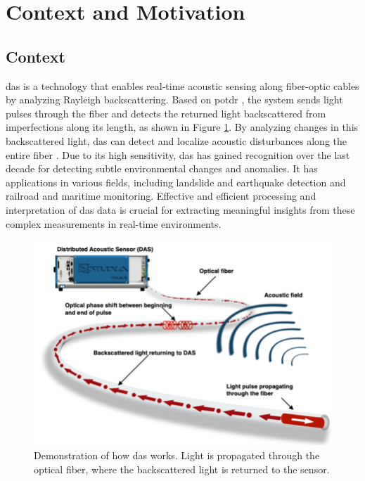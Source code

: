 \section{Context and Motivation}


\subsection{Context} 

\acrshort{das} is a technology that enables real-time acoustic sensing along fiber-optic cables by analyzing Rayleigh backscattering. Based on \acrfull{potdr} \cite{s16050681}, the system sends light pulses through the fiber and detects the returned light backscattered from imperfections along its length, as shown in Figure \ref{fig:das-fig}. By analyzing changes in this backscattered light, \acrshort{das} can detect and localize acoustic disturbances along the entire fiber \cite{shang2016optical}. Due to its high sensitivity, \acrshort{das} has gained recognition over the last decade for detecting subtle environmental changes and anomalies. It has applications in various fields, including landslide and earthquake detection and railroad and maritime monitoring. Effective and efficient processing and interpretation of \acrshort{das} data is crucial for extracting meaningful insights from these complex measurements in real-time environments.

\begin{figure}[!h]
    \centering
    \includegraphics[width=0.7\linewidth]{figures/das.png}
    \caption{Demonstration of how \acrshort{das} works. Light is propagated through the optical fiber, where the backscattered light is returned to the sensor. \footnotemark}
    \label{fig:das-fig}
\end{figure}

